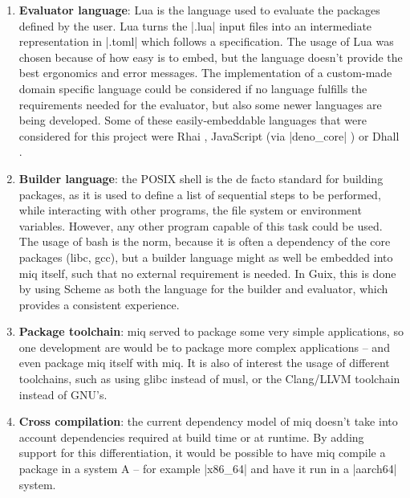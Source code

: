 \begin{enumerate}
    \item \textbf{Evaluator language}: Lua is the language
    used to evaluate the packages defined by the user. Lua
    turns the |.lua| input files into an intermediate
    representation in |.toml| which follows a
    specification. The usage of Lua was chosen because of
    how easy is to embed, but the language doesn't provide
    the best ergonomics and error messages. The
    implementation of a custom-made domain specific language
    could be considered if no language fulfills the
    requirements needed for the evaluator, but also some
    newer languages are being developed. Some of these
    easily-embeddable languages that were
    considered for this project were Rhai
    \cite{RhaiEmbeddedScripting}, JavaScript (via
    |deno_core| \cite{DenoCoreCrates2023}) or Dhall \cite{DhallConfigurationLanguage}.

    \item \textbf{Builder language}: the POSIX shell is the
    de facto standard for building packages, as it is used
    to define a list of sequential steps to be performed,
    while interacting with other programs, the file system or
    environment variables. However, any other program
    capable of this task could be used. The usage of bash is
    the norm, because it is often a dependency of the core
    packages (libc, gcc), but a builder language might as
    well be embedded into miq itself, such that no external
    requirement is needed. In Guix, this is done by using
    Scheme as both the language for the builder and
    evaluator, which provides a consistent experience.

    \item \textbf{Package toolchain}: miq served to package
    some very simple applications, so one development are
    would be to package more complex applications -- and
    even package miq itself with miq. It is also of interest
    the usage of different toolchains, such as using glibc
    instead of musl, or the Clang/LLVM toolchain instead of GNU's.

    \item \textbf{Cross compilation}: the current dependency
    model of miq doesn't take into account dependencies
    required at build time or at runtime. By adding support
    for this differentiation, it would be possible to have
    miq compile a package in a system A -- for example
    |x86_64| and have it run in a |aarch64| system.


\end{enumerate}
